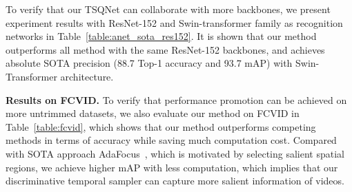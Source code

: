 \documentclass[runningheads]{llncs}
\newcommand{\tabref}[1]{Table~\ref{#1}}
\begin{document}
\begin{table}[t]
\caption{Comparisons with SOTA video recognition methods using ResNet-152 and more advanced recognition networks on AcitivtyNet.}
\label{table:anet_sota_res152}
\centering
\setlength{\tabcolsep}{5pt}
\end{table}

 
To verify that our TSQNet can collaborate with more backbones, we present experiment results with ResNet-152 and Swin-transformer \cite{swintransformer} family as recognition networks in \tabref{table:anet_sota_res152}. It is shown that our method outperforms all method with the same ResNet-152 backbones, and achieves absolute SOTA precision (88.7 Top-1 accuracy and 93.7 mAP) with Swin-Transformer architecture.








\noindent \textbf{Results on FCVID.}
To verify that performance promotion can be achieved on more untrimmed datasets, we also evaluate our method on FCVID in \tabref{table:fcvid}, which shows that our method outperforms competing methods in terms of accuracy while saving much computation cost. 
Compared with SOTA approach AdaFocus~\cite{adafocus}, which is motivated by selecting salient spatial regions, we achieve higher mAP with less computation, which implies that our discriminative temporal sampler can capture more salient information of videos.
\end{document}
